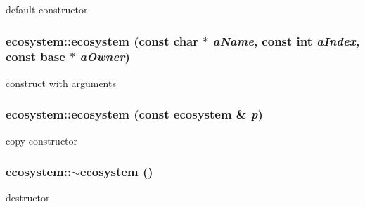 default constructor \hypertarget{classecosystem_a8e76a426eca95f2e287545e7e1ab745e}{
\subsubsection[{ecosystem}]{\setlength{\rightskip}{0pt plus 5cm}ecosystem::ecosystem (const char $\ast$ {\em aName}, \/  const int {\em aIndex}, \/  const {\bf base} $\ast$ {\em aOwner})}}
\label{classecosystem_a8e76a426eca95f2e287545e7e1ab745e}


construct with arguments \hypertarget{classecosystem_a02e07277b33df4f149726d8cb91d1fcc}{
\subsubsection[{ecosystem}]{\setlength{\rightskip}{0pt plus 5cm}ecosystem::ecosystem (const {\bf ecosystem} \& {\em p})}}
\label{classecosystem_a02e07277b33df4f149726d8cb91d1fcc}


copy constructor \hypertarget{classecosystem_a7d57023334e0fbdded2d5a02f1053015}{
\subsubsection[{$\sim$ecosystem}]{\setlength{\rightskip}{0pt plus 5cm}ecosystem::$\sim$ecosystem ()}}
\label{classecosystem_a7d57023334e0fbdded2d5a02f1053015}


destructor 


